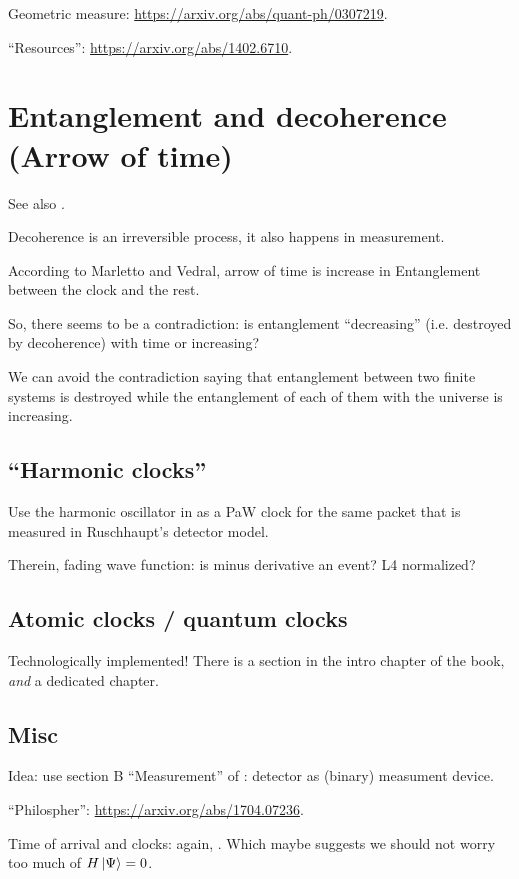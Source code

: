 Geometric measure: \url{https://arxiv.org/abs/quant-ph/0307219}.

``Resources'': \url{https://arxiv.org/abs/1402.6710}.

\section{Entanglement and decoherence (Arrow of time)}
See also \cite{EntanglementVsDecoherence}.

Decoherence is an irreversible process, it also happens in measurement.

According to Marletto and Vedral, arrow of time is increase in Entanglement
between the clock and the rest.

So, there seems to be a contradiction: is entanglement ``decreasing''
(i.e. destroyed by decoherence) with time
or increasing?

We can avoid the contradiction saying that
entanglement between two finite systems is
destroyed while the entanglement of each of them with the universe
is increasing.

\subsection{``Harmonic clocks''}

Use the harmonic oscillator in \cite{HarmonicClocks}
as a PaW clock for the same packet that is measured in
Ruschhaupt's detector model.

Therein, fading wave function: is minus derivative an event?
L4 normalized?

\subsection{Atomic clocks / quantum clocks}
Technologically implemented! There is a section in the intro chapter of the book,
\emph{and} a dedicated chapter.

\subsection{Misc}

Idea: use section B ``Measurement'' of \cite{Lloyd:Time}: detector as (binary) measument device.

``Philospher'': \url{https://arxiv.org/abs/1704.07236}.

Time of arrival and clocks: again, \cite{YearsleyHalliwell_Clocks}.
Which maybe suggests we should not worry too much of $H\ket{\Psi} = 0$.

